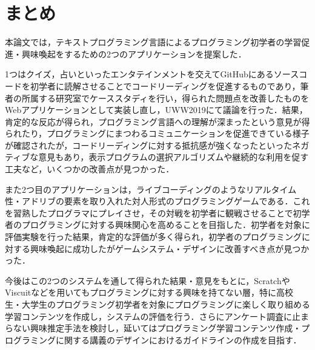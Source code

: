 \section{まとめ}

本論文では，テキストプログラミング言語によるプログラミング初学者の学習促進・興味喚起をするための2つのアプリケーションを提案した．

1つはクイズ，占いといったエンタテインメントを交えてGitHubにあるソースコードを初学者に読解させることでコードリーディングを促進するものであり，筆者の所属する研究室でケーススタディを行い，得られた問題点を改善したものをWebアプリケーションとして実装し直し，UWW2019にて議論を行った．結果，肯定的な反応が得られ，プログラミング言語への理解が深まったという意見が得られたり，プログラミングにまつわるコミュニケーションを促進できている様子が確認されたが，コードリーディングに対する抵抗感が強くなったといったネガティブな意見もあり，表示プログラムの選択アルゴリズムや継続的な利用を促す工夫など，いくつかの改善点が見つかった．

また2つ目のアプリケーションは，ライブコーディングのようなリアルタイム性・アドリブの要素を取り入れた対人形式のプログラミングゲームである．これを習熟したプログラマにプレイさせ，その対戦を初学者に観戦させることで初学者のプログラミングに対する興味関心を高めることを目指した．初学者を対象に評価実験を行った結果，肯定的な評価が多く得られ，初学者のプログラミングに対する興味喚起に成功したがゲームシステム・デザインに改善すべき点が見つかった．

今後はこの2つのシステムを通して得られた結果・意見をもとに，ScratchやViscuitなどを用いてもプログラミングに対する興味を持てない層，特に高校生・大学生のプログラミング初学者を対象にプログラミングに楽しく取り組める学習コンテンツを作成し，システムの評価を行う．さらにアンケート調査に止まらない興味推定手法を検討し，延いてはプログラミング学習コンテンツ作成・プログラミングに関する講義のデザインにおけるガイドラインの作成を目指す．